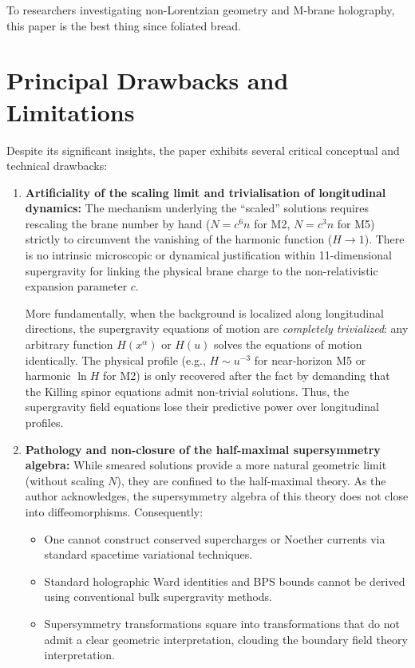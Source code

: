 \documentclass[11pt,a4paper]{article}
\begin{document}
To researchers investigating non-Lorentzian geometry and M-brane holography, this paper is the best thing since foliated bread.

\section{Principal Drawbacks and Limitations}

Despite its significant insights, the paper exhibits several critical conceptual and technical drawbacks:

\begin{enumerate}
    \item \textbf{Artificiality of the scaling limit and trivialisation of longitudinal dynamics:}
    The mechanism underlying the ``scaled'' solutions requires rescaling the brane number by hand ($N = c^6 n$ for M2, $N = c^3 n$ for M5) strictly to circumvent the vanishing of the harmonic function ($H \to 1$). There is no intrinsic microscopic or dynamical justification within 11-dimensional supergravity for linking the physical brane charge to the non-relativistic expansion parameter $c$. 
    
    More fundamentally, when the background is localized along longitudinal directions, the supergravity equations of motion are \emph{completely trivialized}: any arbitrary function $H(x^\alpha)$ or $H(u)$ solves the equations of motion identically. The physical profile (e.g., $H \sim u^{-3}$ for near-horizon M5 or harmonic $\ln H$ for M2) is only recovered after the fact by demanding that the Killing spinor equations admit non-trivial solutions. Thus, the supergravity field equations lose their predictive power over longitudinal profiles.

    \item \textbf{Pathology and non-closure of the half-maximal supersymmetry algebra:}
    While smeared solutions provide a more natural geometric limit (without scaling $N$), they are confined to the half-maximal theory. As the author acknowledges, the supersymmetry algebra of this theory does not close into diffeomorphisms. Consequently:
    \begin{itemize}
        \item One cannot construct conserved supercharges or Noether currents via standard spacetime variational techniques.
        \item Standard holographic Ward identities and BPS bounds cannot be derived using conventional bulk supergravity methods.
        \item Supersymmetry transformations square into transformations that do not admit a clear geometric interpretation, clouding the boundary field theory interpretation.
    \end{itemize}


\end{enumerate}
\end{document}

